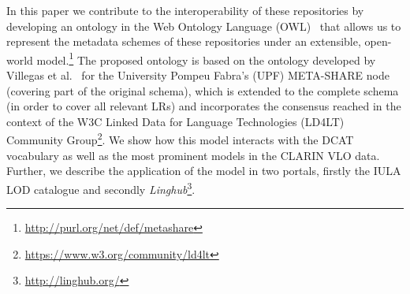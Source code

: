\documentclass{llncs}
\begin{document}
In this paper we contribute to the interoperability of these repositories by
developing an ontology in the Web Ontology Language (OWL)~\cite{motik2012owl}
that allows us to represent the metadata schemes of these repositories under an
extensible, open-world model.\footnote{\url{http://purl.org/net/def/metashare}}
The proposed ontology is based on the ontology developed by Villegas et
al.~\cite{Villegas2014} for the University Pompeu Fabra's (UPF) META-SHARE node (covering part of the original schema), which is extended to the complete schema (in order to cover all relevant LRs) and incorporates the consensus reached in the context of the W3C Linked Data for Language Technologies (LD4LT) Community Group\footnote{\url{https://www.w3.org/community/ld4lt}}.
We show how this model interacts with the DCAT~\cite{maali2014data} vocabulary
as well as the most prominent models in the CLARIN VLO data.
Further, we describe the application of the model in two portals, firstly the
IULA LOD catalogue and secondly
\emph{Linghub}\footnote{\url{http://linghub.org/}}.
\end{document}
